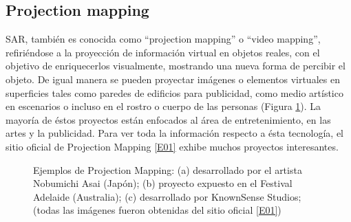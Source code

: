 \documentclass[a4paper,openright,12pt]{report}
\begin{document}
\subsection{Projection mapping}
SAR, también es conocida como ``projection mapping'' o ``video mapping'', refiriéndose a la proyección de información virtual en objetos reales, con el objetivo de enriquecerlos visualmente, mostrando una nueva forma de percibir el objeto. De igual manera se pueden proyectar imágenes o elementos virtuales en superficies tales como paredes de edificios para publicidad, como medio artístico en escenarios o incluso en el rostro o cuerpo de las personas (Figura \ref{fig:projectionmapping}). La mayoría de éstos proyectos están enfocados al área de entretenimiento, en las artes y la publicidad. Para ver toda la información respecto a ésta tecnología, el sitio oficial de Projection Mapping \hyperlink{e01}{[E01]} exhibe muchos proyectos interesantes.
\begin{figure}[h]
	\centering
	\caption[Ejemplos de Projection Mapping]{Ejemplos de Projection Mapping: (a) desarrollado por el artista Nobumichi Asai (Japón); (b) proyecto expuesto en el Festival Adelaide (Australia); (c) desarrollado por KnownSense Studios; (todas las imágenes fueron obtenidas del sitio oficial \hyperlink{e01}{[E01]})} \label{fig:projectionmapping}
\end{figure}\\
\end{document}
